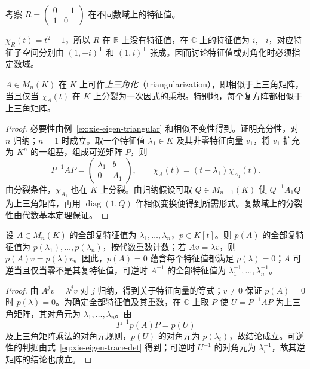 \begin{example}
\label{ex:xie-eigen-field}
考察 $R=\begin{pmatrix}0&-1\\1&0\end{pmatrix}$ 在不同数域上的特征值。
\end{example}
\begin{solve}
$\chi_R(t)=t^2+1$，所以 $R$ 在 $\mathbb R$ 上没有特征值，在 $\mathbb C$ 上的特征值为 $i,-i$，对应特征子空间分别由 $(1,-i)^{\mathsf T}$ 和 $(1,i)^{\mathsf T}$ 张成。因而讨论特征值或对角化时必须指定数域。
\end{solve}

\begin{theorem}[上三角化]
\label{thm:xie-triangularization}
$A\in M_n(K)$ 在 $K$ 上可作\emph{上三角化}（triangularization），即相似于上三角矩阵，当且仅当 $\chi_A(t)$ 在 $K$ 上分裂为一次因式的乘积。特别地，每个复方阵都相似于上三角矩阵。
\end{theorem}
\begin{proof}
必要性由例~\ref{ex:xie-eigen-triangular} 和相似不变性得到。证明充分性，对 $n$ 归纳；$n=1$ 时成立。取一个特征值 $\lambda_1\in K$ 及其非零特征向量 $v_1$，将 $v_1$ 扩充为 $K^n$ 的一组基，组成可逆矩阵 $P$，则
\[
 P^{-1}AP=\begin{pmatrix}\lambda_1&b\\0&A_1\end{pmatrix},
 \qquad \chi_A(t)=(t-\lambda_1)\chi_{A_1}(t).
\]
由分裂条件，$\chi_{A_1}$ 也在 $K$ 上分裂。由归纳假设可取 $Q\in M_{n-1}(K)$ 使 $Q^{-1}A_1Q$ 为上三角矩阵，再用 $\operatorname{diag}(1,Q)$ 作相似变换便得到所需形式。复数域上的分裂性由代数基本定理保证。
\end{proof}

\begin{proposition}[多项式作用于特征值]
\label{prop:xie-polynomial-spectrum}
设 $A\in M_n(K)$ 的全部复特征值为 $\lambda_1,\ldots,\lambda_n$，$p\in K[t]$。则 $p(A)$ 的全部复特征值为 $p(\lambda_1),\ldots,p(\lambda_n)$，按代数重数计数；若 $Av=\lambda v$，则 $p(A)v=p(\lambda)v$。因此，$p(A)=0$ 蕴含每个特征值都满足 $p(\lambda)=0$；$A$ 可逆当且仅当零不是其复特征值，可逆时 $A^{-1}$ 的全部特征值为 $\lambda_1^{-1},\ldots,\lambda_n^{-1}$。
\end{proposition}
\begin{proof}
由 $A^jv=\lambda^jv$ 对 $j$ 归纳，得到关于特征向量的等式；$v\ne0$ 保证 $p(A)=0$ 时 $p(\lambda)=0$。为确定全部特征值及其重数，在 $\mathbb C$ 上取 $P$ 使 $U=P^{-1}AP$ 为上三角矩阵，其对角元为 $\lambda_1,\ldots,\lambda_n$。由
\[
 P^{-1}p(A)P=p(U)
\]
及上三角矩阵乘法的对角元规则，$p(U)$ 的对角元为 $p(\lambda_i)$，故结论成立。可逆性的判据由式~\eqref{eq:xie-eigen-trace-det} 得到；可逆时 $U^{-1}$ 的对角元为 $\lambda_i^{-1}$，故其逆矩阵的结论也成立。
\end{proof}


